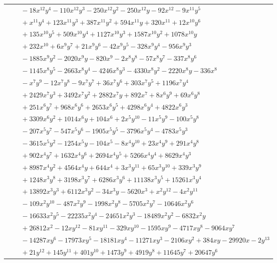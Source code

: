 \documentclass[11pt]{article}
\begin{document}
\begin{longtable}{@{}ll@{}}
 & $\quad -18x^{12}y^{4}-110x^{12}y^{3}-250x^{12}y^{2}-250x^{12}y-92x^{12}-9x^{11}y^{5}$\\
 & $\quad +x^{11}y^{4}+123x^{11}y^{3}+387x^{11}y^{2}+594x^{11}y+320x^{11}+12x^{10}y^{6}$\\
 & $\quad +135x^{10}y^{5}+509x^{10}y^{4}+1127x^{10}y^{3}+1587x^{10}y^{2}+1078x^{10}y$\\
 & $\quad +232x^{10}+6x^{9}y^{7}+21x^{9}y^{6}-42x^{9}y^{5}-328x^{9}y^{4}-956x^{9}y^{3}$\\
 & $\quad -1885x^{9}y^{2}-2020x^{9}y-820x^{9}-2x^{8}y^{8}-57x^{8}y^{7}-337x^{8}y^{6}$\\
 & $\quad -1145x^{8}y^{5}-2663x^{8}y^{4}-4246x^{8}y^{3}-4330x^{8}y^{2}-2220x^{8}y-336x^{8}$\\
 & $\quad -x^{7}y^{9}-12x^{7}y^{8}-9x^{7}y^{7}+36x^{7}y^{6}+303x^{7}y^{5}+1196x^{7}y^{4}$\\
 & $\quad +2429x^{7}y^{3}+3492x^{7}y^{2}+2882x^{7}y+892x^{7}+8x^{6}y^{9}+69x^{6}y^{8}$\\
 & $\quad +251x^{6}y^{7}+968x^{6}y^{6}+2653x^{6}y^{5}+4298x^{6}y^{4}+4822x^{6}y^{3}$\\
 & $\quad +3309x^{6}y^{2}+1014x^{6}y+104x^{6}+2x^{5}y^{10}-11x^{5}y^{9}-100x^{5}y^{8}$\\
 & $\quad -207x^{5}y^{7}-547x^{5}y^{6}-1905x^{5}y^{5}-3796x^{5}y^{4}-4783x^{5}y^{3}$\\
 & $\quad -3615x^{5}y^{2}-1254x^{5}y-104x^{5}-8x^{4}y^{10}+23x^{4}y^{9}+291x^{4}y^{8}$\\
 & $\quad +902x^{4}y^{7}+1632x^{4}y^{6}+2694x^{4}y^{5}+5266x^{4}y^{4}+8629x^{4}y^{3}$\\
 & $\quad +8987x^{4}y^{2}+4564x^{4}y+644x^{4}+3x^{3}y^{11}+65x^{3}y^{10}+339x^{3}y^{9}$\\
 & $\quad +1248x^{3}y^{8}+3198x^{3}y^{7}+6286x^{3}y^{6}+11138x^{3}y^{5}+15261x^{3}y^{4}$\\
 & $\quad +13892x^{3}y^{3}+6112x^{3}y^{2}-34x^{3}y-5620x^{3}+x^{2}y^{12}-4x^{2}y^{11}$\\
 & $\quad -109x^{2}y^{10}-487x^{2}y^{9}-1998x^{2}y^{8}-5705x^{2}y^{7}-10646x^{2}y^{6}$\\
 & $\quad -16633x^{2}y^{5}-22235x^{2}y^{4}-24651x^{2}y^{3}-18489x^{2}y^{2}-6832x^{2}y$\\
 & $\quad +26812x^{2}-12xy^{12}-81xy^{11}-329xy^{10}-1595xy^{9}-4717xy^{8}-9064xy^{7}$\\
 & $\quad -14287xy^{6}-17973xy^{5}-18181xy^{4}-11271xy^{3}-2106xy^{2}+384xy-29920x-2y^{13}$\\
 & $\quad +21y^{12}+145y^{11}+401y^{10}+1473y^{9}+4919y^{8}+11645y^{7}+20647y^{6}$\\

\end{longtable}
\end{document}
